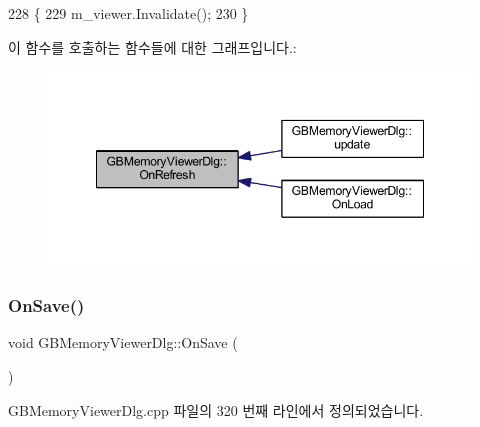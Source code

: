 \begin{DoxyCode}
228 \{
229   m\_viewer.Invalidate();
230 \}
\end{DoxyCode}
이 함수를 호출하는 함수들에 대한 그래프입니다.\+:
\nopagebreak
\begin{figure}[H]
\begin{center}
\leavevmode
\includegraphics[width=348pt]{class_g_b_memory_viewer_dlg_a06c19ee769949ce93010ff891bcac340_icgraph}
\end{center}
\end{figure}
\mbox{\label{class_g_b_memory_viewer_dlg_abea90b70d9579272367ed561fe796b01}} 
\subsubsection{\texorpdfstring{On\+Save()}{OnSave()}}
{\footnotesize\ttfamily void G\+B\+Memory\+Viewer\+Dlg\+::\+On\+Save (\begin{DoxyParamCaption}{ }\end{DoxyParamCaption})\hspace{0.3cm}{\ttfamily [protected]}}



G\+B\+Memory\+Viewer\+Dlg.\+cpp 파일의 320 번째 라인에서 정의되었습니다.


